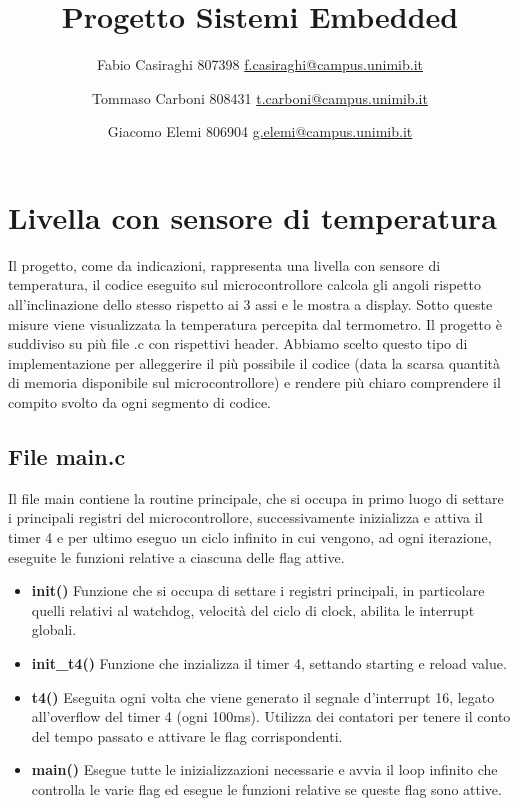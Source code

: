 \documentclass[11pt]{article}
\author{
Fabio Casiraghi 807398 \href{mailto:f.casiraghi@campus.unimib.it}{f.casiraghi@campus.unimib.it}
\and
Tommaso Carboni 808431 \href{mailto:t.carboni@campus.unimib.it} {t.carboni@campus.unimib.it}
\and
Giacomo Elemi 806904 \href{mailto:g.elemi@campus.unimib.it} {g.elemi@campus.unimib.it}
}
\title{Progetto Sistemi Embedded}
\begin{document}
\maketitle
\vspace{2cm}

\section*{Livella con sensore di temperatura}
Il progetto, come da indicazioni, rappresenta una livella con sensore di temperatura, il codice eseguito sul microcontrollore calcola gli angoli rispetto all'inclinazione dello stesso rispetto ai 3 assi e le mostra a display. Sotto queste misure viene visualizzata la temperatura percepita dal termometro.
Il progetto è suddiviso su più file .c con rispettivi header. Abbiamo scelto questo tipo di implementazione per alleggerire il più possibile il codice (data la scarsa quantità di memoria disponibile sul microcontrollore) e rendere più chiaro comprendere il compito svolto da ogni segmento di codice.

\subsection*{File main.c}
Il file main contiene la routine principale, che si occupa in primo luogo di settare i principali registri del microcontrollore, successivamente inizializza e attiva il timer 4 e per ultimo eseguo un ciclo infinito in cui vengono, ad ogni iterazione, eseguite le funzioni relative a ciascuna delle flag attive.
\begin{itemize}
\item \textbf{init()} Funzione che si occupa di settare i registri principali, in particolare quelli relativi al watchdog, velocità del ciclo di clock, abilita le interrupt globali.
\item \textbf{init\_t4()} Funzione che inzializza il timer 4, settando starting e reload value.
\item \textbf{t4()} Eseguita ogni volta che viene generato il segnale d'interrupt 16, legato all'overflow del timer 4 (ogni 100ms). Utilizza dei contatori per tenere il conto del tempo passato e attivare le flag corrispondenti.
\item \textbf{main()} Esegue tutte le inizializzazioni necessarie e avvia il loop infinito che controlla le varie flag ed esegue le funzioni relative se queste flag sono attive.
\end{itemize}
\end{document}

